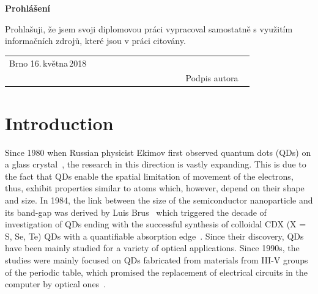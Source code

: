 \documentclass[
a4paper, %
11pt, %
onecolumn, %
openany, %
oldfontcommands,
]{memoir}
\begin{document}
\vfill
\noindent\Large\textbf{Prohlášení}\\ \normalsize

\noindent Prohlašuji, že jsem svoji diplomovou práci vypracoval samostatně
s využitím informačních zdrojů, které jsou v práci citovány.
\vspace{1cm}
\begin{center}
	\centering
	\begin{tabular}{p{0.5\linewidth}p{0.15\linewidth}p{0.25\linewidth}}
		Brno 16.\,května\,2018 &  & \\\cmidrule[0.5pt]{3-3}
		&&\centering Podpis autora \\ 
	\end{tabular}
\end{center}

\newpage



\pagestyle{standard}

\tableofcontents*


\clearpage




\chapter{Introduction}\label{chap:introduction}


Since 1980 when Russian physicist Ekimov first observed quantum dots (QDs) on a glass crystal~\cite{Ekimov}, the research in this direction is vastly expanding. This is due to the fact that QDs enable the spatial limitation of movement of the electrons, thus, exhibit properties similar to atoms which, however, depend on their shape and size. In 1984, the link between the size of the semiconductor nanoparticle and its band-gap was derived by Luis Brus~\cite{Brus} which triggered the decade of investigation of QDs ending with the successful synthesis of colloidal CDX (X = S, Se, Te) QDs with a quantifiable absorption edge~\cite{Murray}. Since their discovery, QDs have been mainly studied for a variety of optical applications. Since 1990s, the studies were mainly focused on QDs fabricated from materials from III-V groups of the periodic table, which promised the replacement of electrical circuits in the computer by optical ones~\cite{Bimberg}. %
\end{document}
